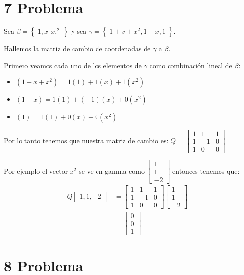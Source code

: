 \documentclass[12pt, fleqn]{article}                             %
\theoremstyle{break}                                            %
\newcommand{\Set}[1]    {\left\{ \; #1 \; \right\}}             %
\newcommand{\bVector}[1]                                        %
        { \ensuremath{\begin{bmatrix}#1\end{bmatrix}} }             %
\begin{document}
\section{7 Problema}

    Sea $\beta = \Set{1, x, x,^2}$ y sea $\gamma = \Set{1+x+x^2, 1-x, 1}$.

    Hallemos la matriz de cambio de coordenadas de $\gamma$ a $\beta$.

    Primero veamos cada uno de los elementos de $\gamma$ como combinación lineal de $\beta$:
    \begin{itemize}
        \item $(1+x+x^2) = 1(1) + 1(x) + 1(x^2)$
        \item $(1-x) = 1(1) + (-1)(x) + 0(x^2)$
        \item $(1) = 1(1) + 0(x) + 0(x^2)$
    \end{itemize}

    Por lo tanto tenemos que nuestra matriz de cambio es:
    $Q = \bVector{1 & 1 & 1 \\ 1 & -1 & 0 \\ 1 & 0 & 0}$

    Por ejemplo el vector $x^2$ se ve en gamma como $\bVector{1 \\ 1 \\ -2}$ entonces tenemos que:
    \begin{align*}
        Q\bVector{1, 1, -2}
            &= \bVector{1 & 1 & 1 \\ 1 & -1 & 0 \\ 1 & 0 & 0} \bVector{1 \\ 1 \\ -2}        \\
            &= \bVector{0 \\ 0 \\ 1}
    \end{align*}


\clearpage
\section{8 Problema}
\end{document}
